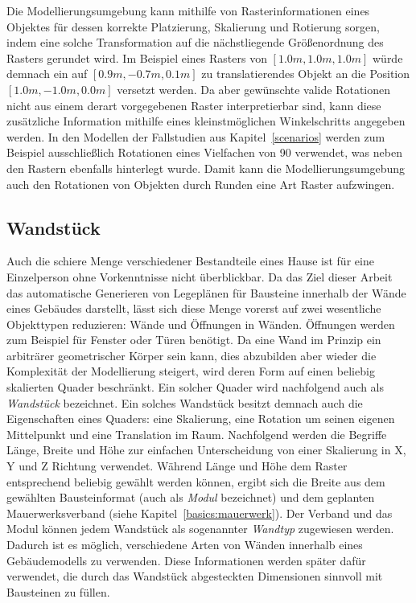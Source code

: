 Die Modellierungsumgebung kann mithilfe von Rasterinformationen eines Objektes für dessen korrekte Platzierung, Skalierung und Rotierung sorgen, indem eine solche Transformation auf die nächstliegende Größenordnung des Rasters gerundet wird.
Im Beispiel eines Rasters von \([1.0m, 1.0m, 1.0m]\) würde demnach ein auf \([0.9m, -0.7m, 0.1m]\) zu translatierendes Objekt an die Position \([1.0m, -1.0m, 0.0m]\) versetzt werden.
Da aber gewünschte valide Rotationen nicht aus einem derart vorgegebenen Raster interpretierbar sind, kann diese zusätzliche Information mithilfe eines kleinstmöglichen Winkelschritts angegeben werden.
In den Modellen der Fallstudien aus Kapitel~\ref{scenarios} werden zum Beispiel ausschließlich Rotationen eines Vielfachen von 90\degree{} verwendet, was neben den Rastern ebenfalls hinterlegt wurde.
Damit kann die Modellierungsumgebung auch den Rotationen von Objekten durch Runden eine Art Raster aufzwingen.

\subsection{Wandstück}
Auch die schiere Menge verschiedener Bestandteile eines Hause ist für eine Einzelperson ohne Vorkenntnisse nicht überblickbar.
Da das Ziel dieser Arbeit das automatische Generieren von Legeplänen für Bausteine innerhalb der Wände eines Gebäudes darstellt, lässt sich diese Menge vorerst auf zwei wesentliche Objekttypen reduzieren:
Wände und Öffnungen in Wänden.
Öffnungen werden zum Beispiel für Fenster oder Türen benötigt.
Da eine Wand im Prinzip ein arbiträrer geometrischer Körper sein kann, dies abzubilden aber wieder die Komplexität der Modellierung steigert, wird deren Form auf einen beliebig skalierten Quader beschränkt.
Ein solcher Quader wird nachfolgend auch als \textit{Wandstück} bezeichnet.
Ein solches Wandstück besitzt demnach auch die Eigenschaften eines Quaders: eine Skalierung, eine Rotation um seinen eigenen Mittelpunkt und eine Translation im Raum.
Nachfolgend werden die Begriffe Länge, Breite und Höhe zur einfachen Unterscheidung von einer Skalierung in X, Y und Z Richtung verwendet.
Während Länge und Höhe dem Raster entsprechend beliebig gewählt werden können, ergibt sich die Breite aus dem gewählten Bausteinformat (auch als \textit{Modul} bezeichnet) und dem geplanten Mauerwerksverband (siehe Kapitel~\ref{basics:mauerwerk}).
Der Verband und das Modul können jedem Wandstück als sogenannter \textit{Wandtyp} zugewiesen werden.
Dadurch ist es möglich, verschiedene Arten von Wänden innerhalb eines Gebäudemodells zu verwenden.
Diese Informationen werden später dafür verwendet, die durch das Wandstück abgesteckten Dimensionen sinnvoll mit Bausteinen zu füllen.

